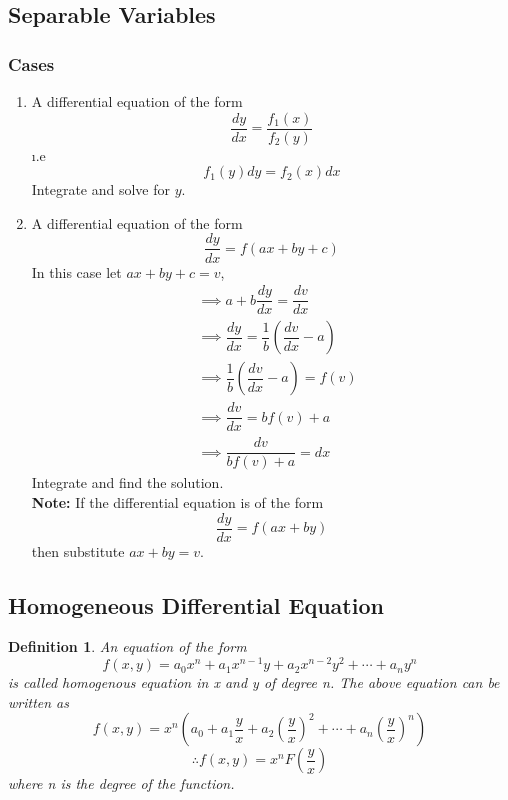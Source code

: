 \documentclass[a4paper, titlepage]{article}
\newtheorem{definition}{Definition}[section]
\begin{document}
\subsection{Separable Variables}

\subsubsection{Cases}
\begin{enumerate}
    \item A differential equation of the form 
    \[ \dfrac{dy}{dx} = \dfrac{f_1(x)}{f_2(y)} \]
    \i.e
    \[ f_1(y)dy = f_2(x)dx \]
    Integrate and solve for $y$.
    \item A differential equation of the form
    \[ \dfrac{dy}{dx} = f(ax + by + c) \]
    In this case let $ax + by + c = v$,
    \begin{align*}
        & \implies a + b\dfrac{dy}{dx} = \dfrac{dv}{dx} \\
        & \implies \dfrac{dy}{dx} = \dfrac{1}{b} \left( \dfrac{dv}{dx} - a \right) \\
        & \implies \dfrac{1}{b} \left( \dfrac{dv}{dx} - a \right) = f(v) \\
        & \implies \dfrac{dv}{dx} = bf(v) + a \\
        & \implies \dfrac{dv}{bf(v) + a} = dx
    \end{align*}
    Integrate and find the solution. \hfill \\
    \textbf{Note: } If the differential equation is of the form 
    \[ \dfrac{dy}{dx} = f(ax + by) \]
    then substitute $ax + by = v$.

\end{enumerate}

\subsection{Homogeneous Differential Equation}
\begin{definition}
    An equation of the form 
    \[ f(x, y) = a_0x^n + a_1x^{n-1}y + a_2x^{n-2}y^2 + \cdots + a_ny^n \] 
    is called homogenous equation in x and y of degree n. The above
    equation can be written as 
    \[ f(x, y) = x^n\left( a_0 + a_1\dfrac{y}{x} + a_2\left( \dfrac{y}{x} \right)^2 + \cdots + a_n\left( \dfrac{y}{x} \right)^n \right) \]
    $$\therefore f(x, y) = x^nF\left( \dfrac{y}{x} \right)$$
    where n is the degree of the function.
\end{definition}
\end{document}
